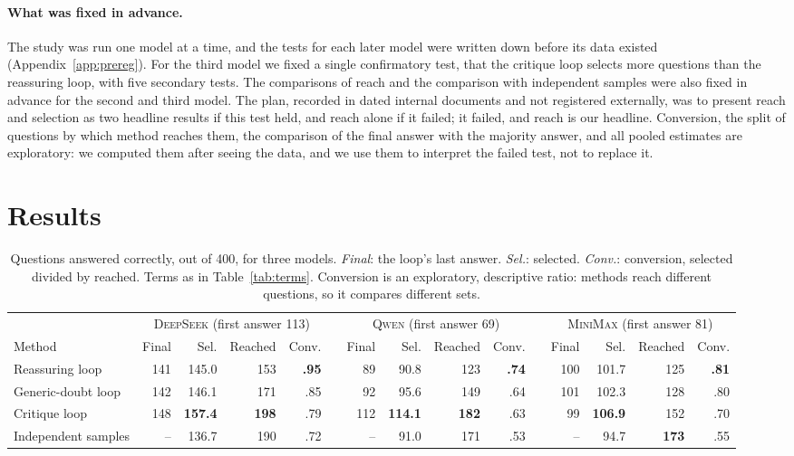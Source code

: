 \documentclass[11pt]{article}
\newcommand{\ds}{\textsc{DeepSeek}}
\newcommand{\qw}{\textsc{Qwen}}
\newcommand{\mm}{\textsc{MiniMax}}
\begin{document}
\paragraph{What was fixed in advance.}
The study was run one model at a time, and the tests for each later model were written down before its data existed (Appendix~\ref{app:prereg}).
For the third model we fixed a single confirmatory test, that the critique loop selects more questions than the reassuring loop, with five secondary tests.
The comparisons of reach and the comparison with independent samples were also fixed in advance for the second and third model.
The plan, recorded in dated internal documents and not registered externally, was to present reach and selection as two headline results if this test held, and reach alone if it failed; it failed, and reach is our headline.
Conversion, the split of questions by which method reaches them, the comparison of the final answer with the majority answer, and all pooled estimates are exploratory: we computed them after seeing the data, and we use them to interpret the failed test, not to replace it.

\section{Results}

\begin{table}[t]
\centering
\small
\setlength{\tabcolsep}{3.4pt}
\begin{tabular}{@{}l rrrr c rrrr c rrrr@{}}
\toprule
 & \multicolumn{4}{c}{\ds{} (first answer 113)} & & \multicolumn{4}{c}{\qw{} (first answer 69)} & & \multicolumn{4}{c}{\mm{} (first answer 81)} \\
\cmidrule(lr){2-5}\cmidrule(lr){7-10}\cmidrule(l){12-15}
Method & Final & Sel. & Reached & Conv. & & Final & Sel. & Reached & Conv. & & Final & Sel. & Reached & Conv. \\
\midrule
Reassuring loop & 141 & 145.0 & 153 & \textbf{.95} & & 89 & 90.8 & 123 & \textbf{.74} & & 100 & 101.7 & 125 & \textbf{.81} \\
Generic-doubt loop & 142 & 146.1 & 171 & .85 & & 92 & 95.6 & 149 & .64 & & 101 & 102.3 & 128 & .80 \\
Critique loop & 148 & \textbf{157.4} & \textbf{198} & .79 & & 112 & \textbf{114.1} & \textbf{182} & .63 & & 99 & \textbf{106.9} & 152 & .70 \\
Independent samples & -- & 136.7 & 190 & .72 & & -- & 91.0 & 171 & .53 & & -- & 94.7 & \textbf{173} & .55 \\
\bottomrule
\end{tabular}
\caption{Questions answered correctly, out of 400, for three models. \emph{Final}: the loop's last answer. \emph{Sel.}: selected. \emph{Conv.}: conversion, selected divided by reached. Terms as in Table~\ref{tab:terms}. Conversion is an exploratory, descriptive ratio: methods reach different questions, so it compares different sets.}
\label{tab:main}
\end{table}
\end{document}
